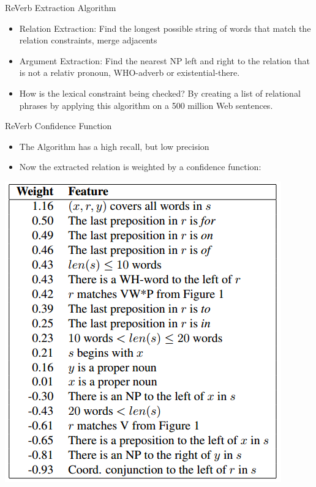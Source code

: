 \documentclass[11pt]{beamer}
\begin{document}
		\begin{frame}{ReVerb Extraction Algorithm}
			\begin{center}
				\begin{itemize}
				\item Relation Extraction: Find the longest possible string of words that match the relation constraints, merge adjacents
				\item Argument Extraction: Find the nearest NP left and right to the relation that is not a relativ pronoun, WHO-adverb or existential-there.
				\item How is the lexical constraint being checked? By creating a list of relational phrases by applying this algorithm on a 500 million Web sentences.
				\end{itemize}
			\end{center}
		\end{frame}
		\begin{frame}{ReVerb Confidence Function}
					\begin{center}
						\begin{itemize}
						\item The Algorithm has a high recall, but low precision
						\item Now the extracted relation is weighted by a confidence function:
						\end{itemize}
						\includegraphics[scale=0.5]{img/sososo.png}\\
					\end{center}
				\end{frame}
\end{document}
